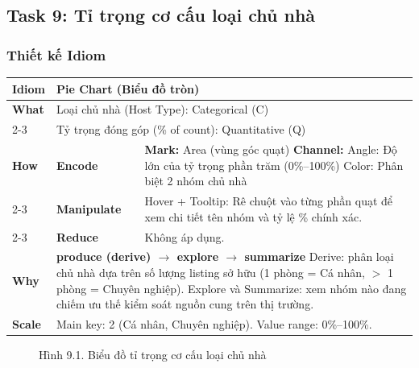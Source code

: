 \subsection{Task 9: Tỉ trọng cơ cấu loại chủ nhà}

\subsubsection{Thiết kế Idiom}

\begin{table}[H]
\centering
\renewcommand{\arraystretch}{1.1}
\begin{tabularx}{\textwidth}{|l|l|X|}
\hline
\textbf{Idiom} & \multicolumn{2}{l|}{\textbf{Pie Chart (Biểu đồ tròn)}} \\ \hline
\textbf{What}
& \multicolumn{2}{X|}{Loại chủ nhà (Host Type): Categorical (C)} \\ \cline{2-3}
& \multicolumn{2}{X|}{Tỷ trọng đóng góp (\% of count): Quantitative (Q)} \\ \hline
\textbf{How}
& \textbf{Encode} &
\textbf{Mark:} Area (vùng góc quạt) \newline
\textbf{Channel:} \newline
\hspace*{1em} Angle: Độ lớn của tỷ trọng phần trăm (0\%--100\%) \newline
\hspace*{1em} Color: Phân biệt 2 nhóm chủ nhà \\ \cline{2-3}
& \textbf{Manipulate} &
Hover + Tooltip: Rê chuột vào từng phần quạt để xem chi tiết tên nhóm và tỷ lệ \% chính xác. \\ \cline{2-3}
& \textbf{Reduce} &
Không áp dụng. \\ \hline
\textbf{Why} & \multicolumn{2}{X|}{
\textbf{produce (derive) $\rightarrow$ explore $\rightarrow$ summarize} \newline
Derive: phân loại chủ nhà dựa trên số lượng listing sở hữu (1 phòng = Cá nhân, $>$ 1 phòng = Chuyên nghiệp). Explore và Summarize: xem nhóm nào đang chiếm ưu thế kiểm soát nguồn cung trên thị trường.
} \\ \hline
\textbf{Scale} & \multicolumn{2}{X|}{
Main key: 2 (Cá nhân, Chuyên nghiệp). \newline
Value range: 0\%--100\%.
} \\ \hline
\end{tabularx}
\end{table}

\begin{figure}[H]
    \centering
    \caption{Hình 9.1. Biểu đồ tỉ trọng cơ cấu loại chủ nhà}
    \label{fig:domain-task9-chart1}
\end{figure}

